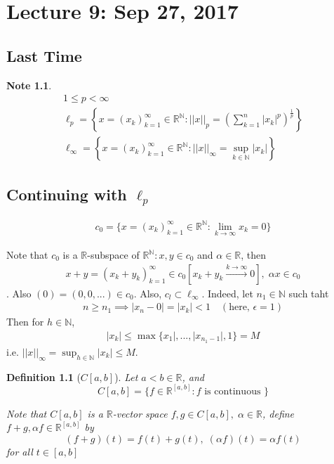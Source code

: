 \documentclass[11pt, oneside]{book}
\theoremstyle{break}
\newtheorem*{note}{Note}
\newtheorem{defn}{Definition}[section]
\newcommand{\bb}[1]{\mathbb{#1}}			%
\begin{document}
\chapter{Lecture 9: Sep 27, 2017}\label{chp:lec9}

\section{Last Time}

\begin{note}
	\begin{gather*}
		1 \leq p < \infty \\
		\ell_p = \left\{x = (x_k)_{k = 1}^\infty \in \bb{R}^\bb{N} : ||x||_p = \left(\sum_{k=1}^{n} |x_k|^p \right)^{\frac{1}{p}} \right\} \\
		\ell_\infty = \left\{ x = (x_k)_{k = 1}^\infty \in \bb{R}^\bb{N} : ||x||_\infty = \sup_{k \in \bb{N}}|x_k| \right\}
	\end{gather*}
\end{note}

\section{Continuing with \texorpdfstring{$\ell_p$}{lp}}\label{sect:l_p space cont}

\begin{gather*}
	c_0 = \{x = (x_k)_{k = 1}^\infty \in \bb{R}^\bb{N} : \lim_{k \to \infty} x_k = 0 \}
\end{gather*}

Note that $c_0$  is a $\bb{R}$-subspace of $\bb{R}^\bb{N} : x, y \in c_0$ and $\alpha \in \bb{R}$, then
\begin{gather*}
	x + y = (x_k + y_k)_{k = 1}^\infty \in c_0 \left[ x_k + y_k \overset{k \to \infty}{\to} 0 \right], \; \alpha x \in c_0
\end{gather*}.
Also $(0) = (0, 0, ... ) \in c_0$. Also, $c_l \subset \ell_\infty$. Indeed, let $n_1 \in \bb{N}$ such taht
\begin{gather*}
	n \geq n_1 \implies |x_n - 0| = |x_k| < 1 \quad (\text{here, } \epsilon = 1)
\end{gather*}
Then for $h \in \bb{N}$,
\begin{gather*}
	|x_k| \leq \max\{x_1|, ..., |x_{n_1 - 1}|, 1 \} = M
\end{gather*}
i.e. $||x||_\infty = \sup_{h \in \bb{N}} |x_k| \leq M$.

\begin{defn}[\texorpdfstring{$C[a, b]$}{}]
	Let $a < b \in \bb{R}$, and
	\begin{equation}
		C[a, b] = \{f \in \bb{R}^{[a,b]} : f \text{ is continuous } \}
	\end{equation}

	Note that $C[a, b]$ is a $\bb{R}$-vector space $f, g \in C[a, b], \; \alpha \in \bb{R}$, define $f + g, \alpha f \in \bb{R}^{[a,b]}$ by
	\begin{equation}
		(f+g)(t) = f(t) + g(t), \; (\alpha f)(t) = \alpha f(t)
	\end{equation}
	for all $t \in [a, b]$
\end{defn}
\end{document}
